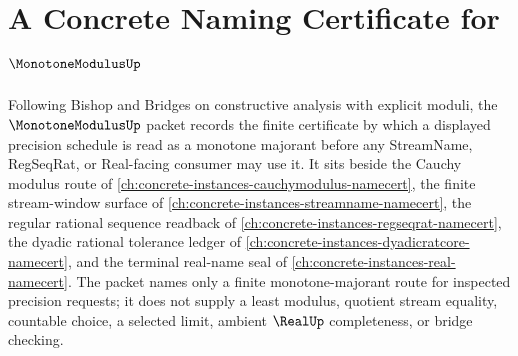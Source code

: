 \chapter{A Concrete Naming Certificate for $\MonotoneModulusUp$}
\label{ch:concrete-instances-monotone-modulus-namecert}

Following Bishop and Bridges on constructive analysis with explicit moduli, the $\MonotoneModulusUp$ packet records the finite certificate by which a displayed precision schedule is read as a monotone majorant before any StreamName, RegSeqRat, or Real-facing consumer may use it. It sits beside the Cauchy modulus route of \autoref{ch:concrete-instances-cauchymodulus-namecert}, the finite stream-window surface of \autoref{ch:concrete-instances-streamname-namecert}, the regular rational sequence readback of \autoref{ch:concrete-instances-regseqrat-namecert}, the dyadic rational tolerance ledger of \autoref{ch:concrete-instances-dyadicratcore-namecert}, and the terminal real-name seal of \autoref{ch:concrete-instances-real-namecert}. The packet names only a finite monotone-majorant route for inspected precision requests; it does not supply a least modulus, quotient stream equality, countable choice, a selected limit, ambient $\RealUp$ completeness, or bridge checking.

